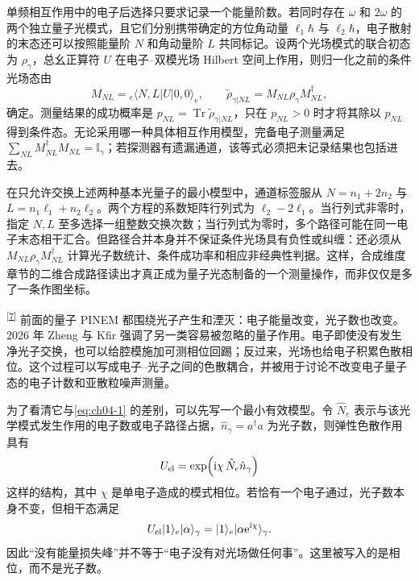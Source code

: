 单频相互作用中的电子后选择只要求记录一个能量阶数。若同时存在 $\omega$ 和 $2\omega$ 的两个独立量子光模式，且它们分别携带确定的方位角动量 $\ell_1\hbar$ 与 $\ell_2\hbar$，电子散射的末态还可以按照能量阶 $N$ 和角动量阶 $L$ 共同标记。设两个光场模式的联合初态为 $\rho_{\gamma}$，总幺正算符 $U$ 在电子--双模光场 Hilbert 空间上作用，则归一化之前的条件光场态由
\begin{equation}
M_{NL}={}_e\!\langle N,L|U|0,0\rangle_e,\qquad
\widetilde\rho_{\gamma|NL}=M_{NL}\rho_{\gamma}M_{NL}^\dagger,
\label{eq:two-mode-optical-kraus}
\end{equation}
确定。测量结果的成功概率是 $p_{NL}=\operatorname{Tr}\widetilde\rho_{\gamma|NL}$，只在 $p_{NL}>0$ 时才将其除以 $p_{NL}$ 得到条件态。无论采用哪一种具体相互作用模型，完备电子测量满足 $\sum_{NL}M_{NL}^\dagger M_{NL}=\mathbb I_{\gamma}$；若探测器有遗漏通道，该等式必须把未记录结果也包括进去。

在只允许交换上述两种基本光量子的最小模型中，通道标签服从 $N=n_1+2n_2$ 与 $L=n_1\ell_1+n_2\ell_2$。两个方程的系数矩阵行列式为 $\ell_2-2\ell_1$。当行列式非零时，指定 $N,L$ 至多选择一组整数交换次数；当行列式为零时，多个路径可能在同一电子末态相干汇合。但路径合并本身并不保证条件光场具有负性或纠缠：还必须从 $M_{NL}\rho_{\gamma}M_{NL}^\dagger$ 计算光子数统计、条件成功率和相应非经典性判据。这样，合成维度章节的二维合成路径读出才真正成为量子光态制备的一个测量操作，而非仅仅是多了一条作图坐标。

\textsuperscript{\hyperref[ch04-ref7]{[7]}}
前面的量子 PINEM 都围绕光子产生和湮灭：电子能量改变，光子数也改变。2026 年 Zheng 与 Kfir 强调了另一类容易被忽略的量子作用。电子即使没有发生净光子交换，也可以给腔模施加可测相位回踢；反过来，光场也给电子积累色散相位。这个过程可以写成电子--光子之间的色散耦合，并被用于讨论不改变电子量子态的电子计数和亚散粒噪声测量。

为了看清它与\cref{eq:ch04-1} 的差别，可以先写一个最小有效模型。令 $\hat N_e$ 表示与该光学模式发生作用的电子数或电子路径占据，$\hat n_\gamma=a^\dagger a$ 为光子数，则弹性色散作用具有
\begin{equation}
U_{\rm el}=\exp\!\left(\mathrm{i}\chi\,\hat N_e\hat n_\gamma\right)
\label{eq:ch04-elastic-unitary}
\end{equation}
这样的结构，其中 $\chi$ 是单电子造成的模式相位。若恰有一个电子通过，光子数本身不变，但相干态满足
\begin{equation}
U_{\rm el}|1\rangle_e|\alpha\rangle_\gamma
=|1\rangle_e|\alpha \mathrm{e}^{\mathrm{i}\chi}\rangle_\gamma.
\label{eq:ch04-phase-kickback}
\end{equation}
因此“没有能量损失峰”并不等于“电子没有对光场做任何事”。这里被写入的是相位，而不是光子数。

